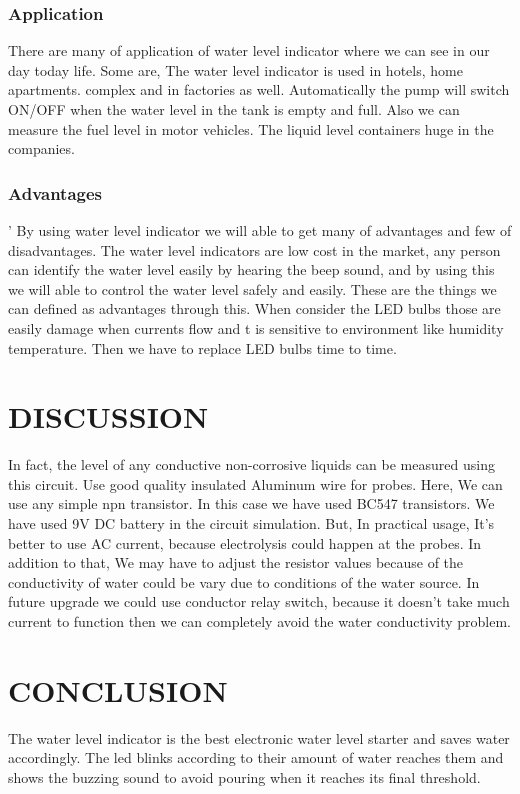 \documentclass[12pt,a4paper,oneside]{book}
\theoremstyle{plain}
\numberwithin{equation}{chapter} \DeclareMathOperator{\Var}{Var}
\begin{document}
\newpage

\subsection{Application}
There are many of application of water level indicator where we can see in our day today life. Some are, The water level indicator is used in hotels, home apartments. complex and in factories as well. Automatically the pump will switch ON/OFF when the water level in the tank is empty and full. Also we can measure the fuel level in motor vehicles. The liquid level containers huge in the companies. 

\subsection{Advantages}'
By using water level indicator we will able to get many of advantages and few of disadvantages. The water level indicators are low cost in the market, any person can identify the water level easily by hearing the beep sound, and by using this we will able to control the water level safely and easily. These are the things we can defined as advantages through this. When consider the LED bulbs those are easily damage when currents flow and t is sensitive to environment like humidity temperature. Then we have to replace LED bulbs time to time. 

\newpage

\chapter{DISCUSSION}
In fact, the level of any conductive non-corrosive liquids can be measured using this circuit.  Use good quality insulated Aluminum wire for probes. Here, We can use any simple npn transistor. In this case we have used BC547 transistors. We have used 9V DC battery in the circuit simulation. But, In practical usage, It's better to use AC current, because electrolysis could happen at the probes. In addition to that, We may have to adjust the resistor values because of the conductivity of water could be vary due to conditions of the water source. In future upgrade we could use conductor relay switch, because it doesn't take much current to function then we can completely avoid the water conductivity problem.



\newpage

\chapter{CONCLUSION}
The water level indicator is the best electronic water level starter and saves water accordingly. The led blinks according to their amount of water reaches them and shows the buzzing sound to avoid pouring when it reaches its final threshold.
\end{document}
